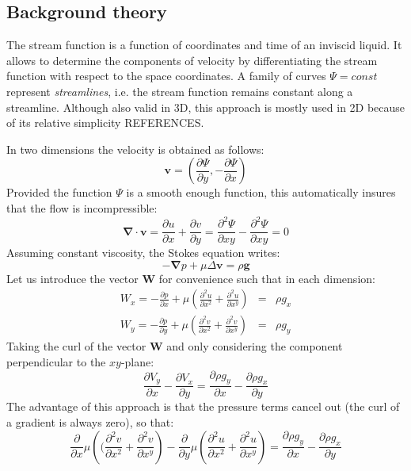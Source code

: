 \subsection*{Background theory}
The stream function is a function of coordinates and time of an inviscid liquid.
It allows to determine the components of velocity by differentiating the stream function 
with respect to the space coordinates. 
A family of curves $\Psi = const$ represent {\it streamlines}, i.e. 
the stream function remains constant along a streamline. 
Although also valid in 3D, this approach is mostly used in 2D because of its 
relative simplicity {\color{red} REFERENCES}.

In two dimensions the velocity is obtained as follows:
\begin{equation}
{\bm v} = \left( \frac{\partial \Psi}{\partial y},-\frac{\partial \Psi}{\partial x} \right) 
\end{equation}
Provided the function $\Psi$ is a smooth enough function, 
this automatically insures that the flow is incompressible:
\begin{equation}
{\bm \nabla}\cdot {\bm v} = 
\frac{\partial u}{\partial x} + \frac{\partial v}{\partial y}
=
\frac{\partial^2 \Psi}{\partial xy} - \frac{\partial^2 \Psi}{\partial xy} =0 
\end{equation}
Assuming constant viscosity, the Stokes equation writes:
\begin{equation}
-{\bm \nabla}p + \mu \Delta {\bm v} = \rho {\bm g}
\end{equation}
Let us introduce the vector ${\bm W}$ for convenience such that in each dimension:
\begin{eqnarray}
W_x=-\frac{\partial p}{\partial x} 
+ \mu\left( \frac{\partial^2 u}{\partial x^2} + \frac{\partial^2 u}{\partial x^y} \right)&=& \rho g_x  \\
W_y=-\frac{\partial p}{\partial y} 
+ \mu \left(\frac{\partial^2 v}{\partial x^2} + \frac{\partial^2 v}{\partial x^y} \right) &=& \rho g_y  
\end{eqnarray}
Taking the curl of the vector ${\bm W}$ and only considering the component perpendicular to the $xy$-plane:
\begin{equation}
\frac{\partial V_y}{\partial x} - \frac{\partial V_x}{\partial y}  = 
\frac{\partial \rho g_y}{\partial x} - \frac{\partial \rho g_x}{\partial y}   
\end{equation}
The advantage of this approach is that the pressure terms cancel out (the curl of a gradient is always zero), 
so that:
\begin{equation}
\frac{\partial}{\partial x}\mu\left(( \frac{\partial^2 v}{\partial x^2} + \frac{\partial^2 v}{\partial x^y}  \right) 
- \frac{\partial }{\partial y} \mu \left( \frac{\partial^2 u}{\partial x^2} + \frac{\partial^2 u}{\partial x^y} \right) = 
\frac{\partial \rho g_y}{\partial x} - \frac{\partial \rho g_x}{\partial y}   
\end{equation}
